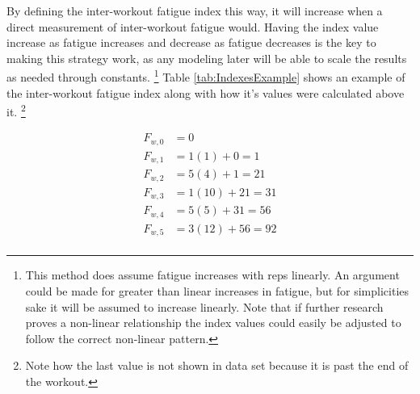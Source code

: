 
By defining the inter-workout fatigue index this way, it will increase when a direct measurement of inter-workout fatigue would. Having the index value increase as fatigue increases and decrease as fatigue decreases is the key to making this strategy work, as any modeling later will be able to scale the results as needed through constants. \footnote{This method does assume fatigue increases with reps linearly. An argument could be made for greater than linear increases in fatigue, but for simplicities sake it will be assumed to increase linearly. Note that if further research proves a non-linear relationship the index values could easily be adjusted to follow the correct non-linear pattern.} Table \ref{tab:IndexesExample} shows an example of the inter-workout fatigue index along with how it's values were calculated above it. \footnote{Note how the last value is not shown in data set because it is past the end of the workout.}

\begin{equation*}
	\begin{aligned}
		F_{w,0} & =0 \\
		F_{w,1} & =1(1)+0=1 \\
		F_{w,2} & =5(4)+1=21 \\
		F_{w,3} & =1(10)+21=31 \\
		F_{w,4} & =5(5)+31=56 \\
		F_{w,5} & =3(12)+56=92  \\
	\end{aligned}
\end{equation*}

